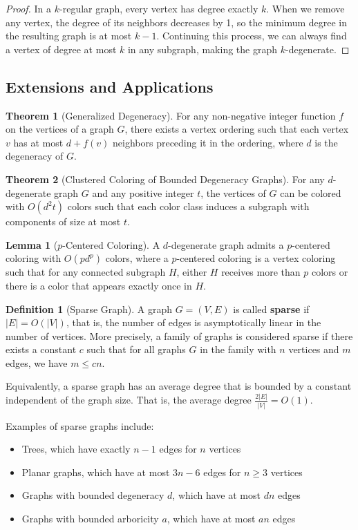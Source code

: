 \documentclass{article}
\theoremstyle{definition}
\newtheorem{theorem}{Theorem}
\newtheorem{lemma}{Lemma}
\newtheorem{definition}{Definition}
\begin{document}
\begin{proof}
In a $k$-regular graph, every vertex has degree exactly $k$. When we remove any vertex, the degree of its neighbors decreases by 1, so the minimum degree in the resulting graph is at most $k-1$. Continuing this process, we can always find a vertex of degree at most $k$ in any subgraph, making the graph $k$-degenerate.
\end{proof}

\subsection{Extensions and Applications}

\begin{theorem}[Generalized Degeneracy]
For any non-negative integer function $f$ on the vertices of a graph $G$, there exists a vertex ordering such that each vertex $v$ has at most $d + f(v)$ neighbors preceding it in the ordering, where $d$ is the degeneracy of $G$.
\end{theorem}

\begin{theorem}[Clustered Coloring of Bounded Degeneracy Graphs]
For any $d$-degenerate graph $G$ and any positive integer $t$, the vertices of $G$ can be colored with $O(d^2 t)$ colors such that each color class induces a subgraph with components of size at most $t$.
\end{theorem}

\begin{lemma}[$p$-Centered Coloring]
A $d$-degenerate graph admits a $p$-centered coloring with $O(p d^p)$ colors, where a $p$-centered coloring is a vertex coloring such that for any connected subgraph $H$, either $H$ receives more than $p$ colors or there is a color that appears exactly once in $H$.
\end{lemma}

\begin{definition}[Sparse Graph]
A graph $G = (V, E)$ is called \textbf{sparse} if $|E| = O(|V|)$, that is, the number of edges is asymptotically linear in the number of vertices. More precisely, a family of graphs is considered sparse if there exists a constant $c$ such that for all graphs $G$ in the family with $n$ vertices and $m$ edges, we have $m \leq cn$.

Equivalently, a sparse graph has an average degree that is bounded by a constant independent of the graph size. That is, the average degree $\frac{2|E|}{|V|} = O(1)$.

Examples of sparse graphs include:
\begin{itemize}
    \item Trees, which have exactly $n-1$ edges for $n$ vertices
    \item Planar graphs, which have at most $3n-6$ edges for $n \geq 3$ vertices
    \item Graphs with bounded degeneracy $d$, which have at most $dn$ edges
    \item Graphs with bounded arboricity $a$, which have at most $an$ edges
\end{itemize}
\end{definition}
\end{document}
